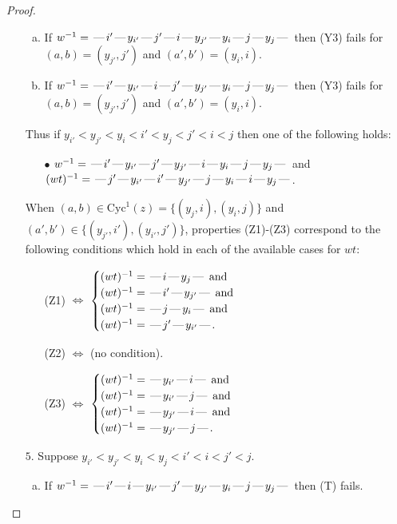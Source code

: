 \documentclass[10pt]{article}
\theoremstyle{definition}
\theoremstyle{definition}
\def\dash{\text{\hspace{0.5mm}---\hspace{0.5mm}}}
\def\Cyc{\mathrm{Cyc}}
\begin{document}
\begin{proof}
\begin{enumerate}
\begin{enumerate}[(a)]
\item If $w^{-1} = \dash i'\dash y_{i'}\dash j'\dash i\dash y_{j'}\dash y_i\dash j\dash y_j\dash $ then (Y3) fails for $(a,b)=(y_{j'},j')$ and $(a',b')=(y_i,i)$.
\item If $w^{-1} = \dash i'\dash y_{i'}\dash i\dash j'\dash y_{j'}\dash y_i\dash j\dash y_j\dash $ then (Y3) fails for $(a,b)=(y_{j'},j')$ and $(a',b')=(y_i,i)$.
\end{enumerate}
Thus if $y_{i'} < y_{j'} < y_i < i' < y_j < j' < i < j$ then one of the following holds:
\begin{enumerate}
\item[$\bullet$] $w^{-1} = \dash i'\dash y_{i'}\dash j'\dash y_{j'}\dash i\dash y_i\dash j\dash y_j\dash $ and $(wt)^{-1} = \dash j'\dash y_{i'}\dash i'\dash y_{j'}\dash j\dash y_i\dash i\dash y_j\dash $.
\end{enumerate}
When $(a,b)\in\Cyc^1(z)=\{(y_j,i),(y_i,j)\}$ and $(a',b')\in\{(y_{j'},i'),(y_{i'},j')\}$,
properties (Z1)-(Z3) correspond to the following conditions which
hold in each of the available cases for $wt$:
\begin{enumerate}
\item[](Z1) $\Leftrightarrow$ $\begin{cases}\text{$(wt)^{-1} = \dash i \dash y_j \dash$}\text{ and }\\
\text{$(wt)^{-1} = \dash i' \dash y_{j'} \dash$}\text{ and }\\
\text{$(wt)^{-1} = \dash j \dash y_i \dash$}\text{ and }\\
\text{$(wt)^{-1} = \dash j' \dash y_{i'} \dash$}.\end{cases}$
\item[](Z2) $\Leftrightarrow$ (no condition).
\item[](Z3) $\Leftrightarrow$ $\begin{cases}\text{$(wt)^{-1} = \dash y_{i'} \dash i \dash$}\text{ and }\\
\text{$(wt)^{-1} = \dash y_{i'} \dash j \dash$}\text{ and }\\
\text{$(wt)^{-1} = \dash y_{j'} \dash i \dash$}\text{ and }\\
\text{$(wt)^{-1} = \dash y_{j'} \dash j \dash$}.\end{cases}$
\end{enumerate}
\item[$5$.] Suppose $y_{i'} < y_{j'} < y_i < y_j < i' < i < j' < j$.
\begin{enumerate}[(a)]
\item If $w^{-1} = \dash i'\dash i\dash y_{i'}\dash j'\dash y_{j'}\dash y_i\dash j\dash y_j\dash $ then (T) fails.

\end{enumerate}
\end{enumerate}
\end{proof}
\end{document}
